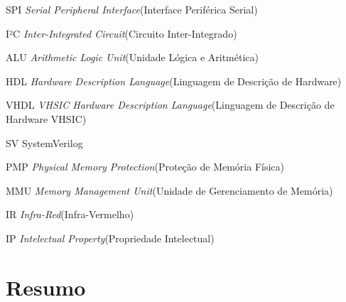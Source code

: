\documentclass[
	12pt,				%
	openright,			%
	oneside,			%
	a4paper,			%
	english,			%
	french,				%
	spanish,			%
	brazil,				%
	]{abntex2}
\begin{document}
\begin{siglas}
\item[SPI] \textit{Serial Peripheral Interface}(Interface Periférica Serial)
\item[I²C] \textit{Inter-Integrated Circuit}(Circuito Inter-Integrado)
\item[ALU] \textit{Arithmetic Logic Unit}(Unidade Lógica e Aritmética)
\item[HDL] \textit{Hardware Description Language}(Linguagem de Descrição de Hardware)
\item[VHDL] \textit{VHSIC Hardware Description Language}(Linguagem de Descrição de Hardware VHSIC)
\item[SV] SystemVerilog
\item[PMP] \textit{Physical Memory Protection}(Proteção de Memória Física)
\item[MMU] \textit{Memory Management Unit}(Unidade de Gerenciamento de Memória)
\item[IR]  \textit{Infra-Red}(Infra-Vermelho)
\item[IP]  \textit{Intelectual Property}(Propriedade Intelectual)
\end{siglas}


\chapter*{Resumo}

\noindent
\end{document}

